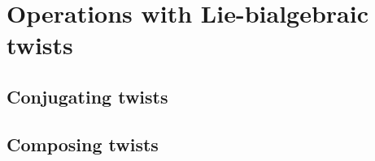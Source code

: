 \section{Operations with Lie-bialgebraic twists}
    \subsection{Conjugating twists}

    \subsection{Composing twists} \label{subsection: composing_twists_of_lie_bialgebras}